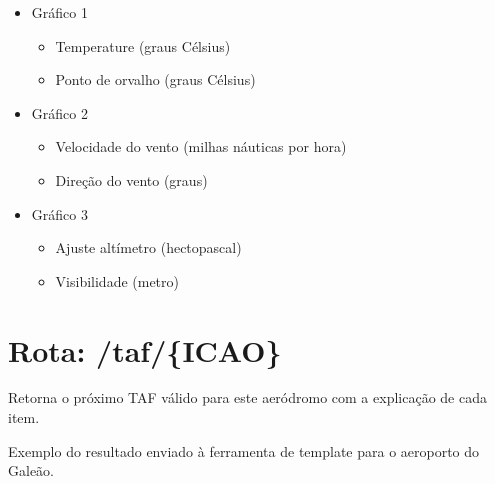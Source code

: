 \begin{itemize}
    \item Gráfico 1
    \begin{itemize}
        \item Temperature (graus Célsius)
        \item Ponto de orvalho (graus Célsius)
    \end{itemize}
    \item Gráfico 2
    \begin{itemize}
        \item Velocidade do vento (milhas náuticas por hora)
        \item Direção do vento (graus)
    \end{itemize}
    \item Gráfico 3
    \begin{itemize}
        \item Ajuste altímetro (hectopascal)
        \item Visibilidade (metro)
    \end{itemize}
\end{itemize}

\section{Rota: /taf/\{ICAO\}}
Retorna o próximo TAF válido para este aeródromo com a explicação de cada item.

Exemplo do resultado enviado à ferramenta de template para o aeroporto do Galeão.

